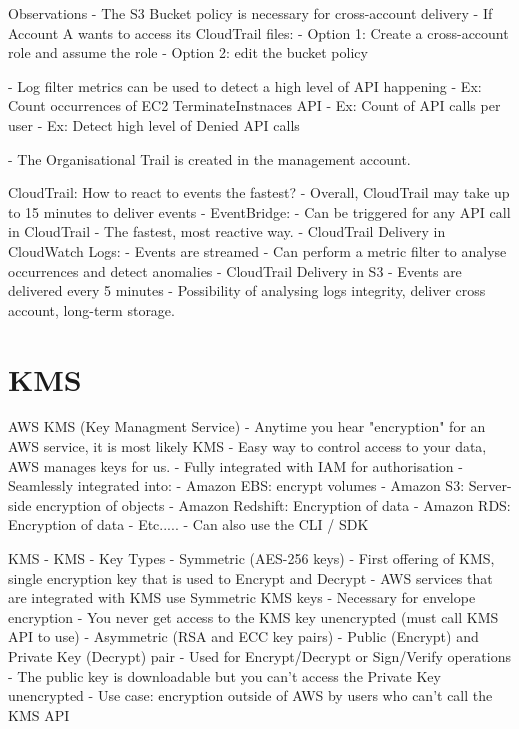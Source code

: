\documentclass[11pt]{book}
\begin{document}
    Observations
    - The S3 Bucket policy is necessary for cross-account delivery
    - If Account A wants to access its CloudTrail files:
        - Option 1: Create a cross-account role and assume the role
        - Option 2: edit the bucket policy

    - Log filter metrics can be used to detect a high level of API happening
    - Ex: Count occurrences of EC2 TerminateInstnaces API
    - Ex: Count of API calls per user
    - Ex: Detect high level of Denied API calls

    - The Organisational Trail is created in the management account.

    CloudTrail: How to react to events the fastest?
    - Overall, CloudTrail may take up to 15 minutes to deliver events
    - EventBridge:
        - Can be triggered for any API call in CloudTrail
        - The fastest, most reactive way.
    - CloudTrail Delivery in CloudWatch Logs:
        - Events are streamed
        - Can perform a metric filter to analyse occurrences and detect anomalies
    - CloudTrail Delivery in S3
        - Events are delivered every 5 minutes
        - Possibility of analysing logs integrity, deliver cross account, long-term storage.

    \section{KMS}

    AWS KMS (Key Managment Service)
    - Anytime you hear "encryption" for an AWS service, it is most likely KMS
    - Easy way to control access to your data, AWS manages keys for us.
    - Fully integrated with IAM for authorisation
    - Seamlessly integrated into:
        - Amazon EBS: encrypt volumes
        - Amazon S3: Server-side encryption of objects
        - Amazon Redshift: Encryption of data
        - Amazon RDS: Encryption of data
        - Etc.....
    - Can also use the CLI / SDK

    KMS - KMS - Key Types
    - Symmetric (AES-256 keys)
        - First offering of KMS, single encryption key that is used to Encrypt and Decrypt
        - AWS services that are integrated with KMS use Symmetric KMS keys
        - Necessary for envelope encryption
        - You never get access to the KMS key unencrypted (must call KMS API to use)
    - Asymmetric (RSA and ECC key pairs)
        - Public (Encrypt) and Private Key (Decrypt) pair
        - Used for Encrypt/Decrypt or Sign/Verify operations
        - The public key is downloadable but you can't access the Private Key unencrypted
        - Use case: encryption outside of AWS by users who can't call the KMS API
\end{document}
